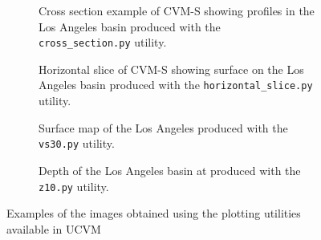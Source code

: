 
\begin{figure*}[ht!]
	\centering
    \begin{subfigure}[b]{0.45\textwidth}
		\fbox{\begin{minipage}{\textwidth}\textcolor{red}{PENDING}\vspace{2in}\end{minipage}}
        \caption{Cross section example of CVM-S showing \vs{} profiles in the Los Angeles basin produced with the \texttt{cross\_section.py} utility.}
        \label{fig:cross.section}
    \end{subfigure}%
	\qquad
	\begin{subfigure}[b]{0.45\textwidth}
		\fbox{\begin{minipage}{\textwidth}\textcolor{red}{PENDING}\vspace{2in}\end{minipage}}
        \caption{Horizontal slice of CVM-S showing surface \vs{} on the Los Angeles basin produced with the \texttt{horizontal\_slice.py} utility.}
        \label{fig:h.slice}
    \end{subfigure}%
    \vspace{2ex}
    \begin{subfigure}[b]{0.45\textwidth}
		\fbox{\begin{minipage}{\textwidth}\textcolor{red}{PENDING}\vspace{2in}\end{minipage}}
        \caption{Surface \vsthirty{} map of the Los Angeles produced with the \texttt{vs30.py} utility.}
        \label{fig:vs.thirty}
    \end{subfigure}%
	\qquad
	\begin{subfigure}[b]{0.45\textwidth}
		\fbox{\begin{minipage}{\textwidth}\textcolor{red}{PENDING}\vspace{2in}\end{minipage}}
        \caption{Depth of the Los Angeles basin at  produced with the \texttt{z10.py} utility.}
        \label{fig:basin.depth}
    \end{subfigure}%
    \caption{Examples of the images obtained using the plotting utilities available in UCVM}
    \label{fig:plot.samples}
\end{figure*}